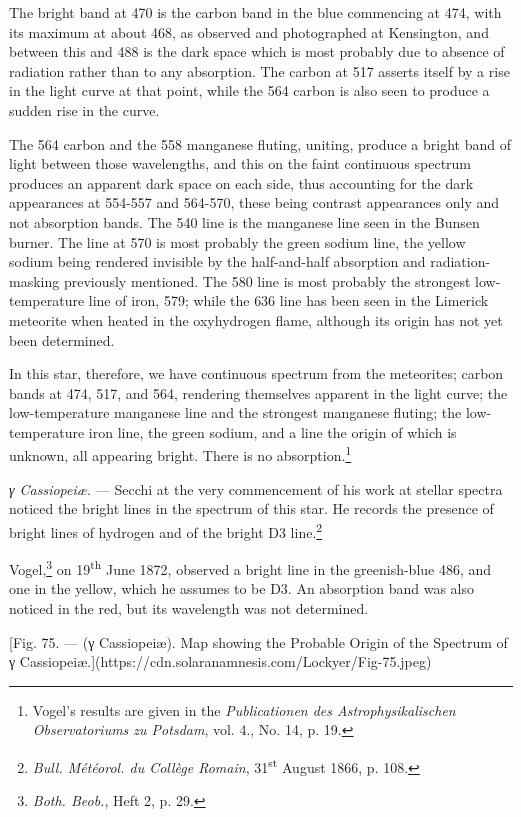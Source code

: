 \documentclass[a4paper, 12pt, oneside, polutonikogreek, english]{article}
\begin{document}
The bright band at 470 is the carbon band in the blue commencing at 474, with its maximum at about 468, as observed and photographed at Kensington, and between this and 488 is the dark space which is most probably due to absence of radiation rather than to any absorption. The carbon at 517 asserts itself by a rise in the light curve at that point, while the 564 carbon is also seen to produce a sudden rise in the curve.

The 564 carbon and the 558 manganese fluting, uniting, produce a bright band of light between those wavelengths, and this on the faint continuous spectrum produces an apparent dark space on each side, thus accounting for the dark appearances at 554-557 and 564-570, these being contrast appearances only and not absorption bands. The 540 line is the manganese line seen in the Bunsen burner. The line at 570 is most probably the green sodium line, the yellow sodium being rendered invisible by the half-and-half absorption and radiation-masking previously mentioned. The 580 line is most probably the strongest low-temperature line of iron, 579; while the 636 line has been seen in the Limerick meteorite when heated in the oxyhydrogen flame, although its origin has not yet been determined.

In this star, therefore, we have continuous spectrum from the meteorites; carbon bands at 474, 517, and 564, rendering themselves apparent in the light curve; the low-temperature manganese line and the strongest manganese fluting; the low-temperature iron line, the green sodium, and a line the origin of which is unknown, all appearing bright. There is no absorption.\footnote{Vogel's results are given in the \emph{Publicationen des Astrophysikalischen Observatoriums zu Potsdam}, vol. 4., No. 14, p. 19.}

\emph{γ Cassiopeiæ.} --- Secchi at the very commencement of his work at stellar spectra noticed the bright lines in the spectrum of this star. He records the presence of bright lines of hydrogen and of the bright D3 line.\footnote{\emph{Bull. Météorol. du Collège Romain}, 31\textsuperscript{st} August 1866, p. 108.}

Vogel,\footnote{\emph{Both. Beob.}, Heft 2, p. 29.} on 19\textsuperscript{th} June 1872, observed a bright line in the greenish-blue 486, and one in the yellow, which he assumes to be D3. An absorption band was also noticed in the red, but its wavelength was not determined.

[Fig. 75. --- (γ Cassiopeiæ). Map showing the Probable Origin of the Spectrum of γ Cassiopeiæ.](https://cdn.solaranamnesis.com/Lockyer/Fig-75.jpeg)
\end{document}

